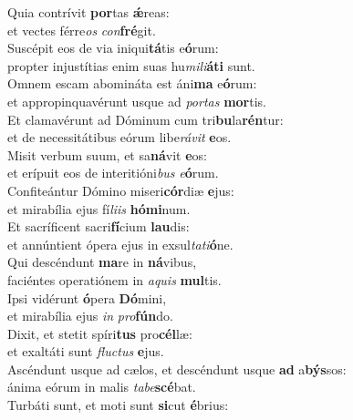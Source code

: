 \evenverse Quia contrívit \textbf{por}tas \textbf{ǽ}reas:~\*\\
\evenverse et vectes férre\textit{os} \textit{con}\textbf{fré}git.\\
\oddverse Suscépit eos de via iniqui\textbf{tá}tis e\textbf{ó}rum:~\*\\
\oddverse propter injustítias enim suas hu\textit{mi}\textit{li}\textbf{á}\textbf{ti} sunt.\\
\evenverse Omnem escam abomináta est áni\textbf{ma} e\textbf{ó}rum:~\*\\
\evenverse et appropinquavérunt usque ad \textit{por}\textit{tas} \textbf{mor}tis.\\
\oddverse Et clamavérunt ad Dóminum cum tri\textbf{bu}la\textbf{rén}tur:~\*\\
\oddverse et de necessitátibus eórum libe\textit{rá}\textit{vit} \textbf{e}os.\\
\evenverse Misit verbum suum, et sa\textbf{ná}vit \textbf{e}os:~\*\\
\evenverse et erípuit eos de interitióni\textit{bus} \textit{e}\textbf{ó}rum.\\
\oddverse Confiteántur Dómino miseri\textbf{cór}diæ \textbf{e}jus:~\*\\
\oddverse et mirabília ejus fí\textit{li}\textit{is} \textbf{hó}\textbf{mi}num.\\
\evenverse Et sacríficent sacri\textbf{fí}cium \textbf{lau}dis:~\*\\
\evenverse et annúntient ópera ejus in exsul\textit{ta}\textit{ti}\textbf{ó}ne.\\
\oddverse Qui descéndunt \textbf{ma}re in \textbf{ná}vibus,~\*\\
\oddverse faciéntes operatiónem in \textit{a}\textit{quis} \textbf{mul}tis.\\
\evenverse Ipsi vidérunt \textbf{ó}pera \textbf{Dó}mini,~\*\\
\evenverse et mirabília ejus \textit{in} \textit{pro}\textbf{fún}do.\\
\oddverse Dixit, et stetit spíri\textbf{tus} pro\textbf{cél}læ:~\*\\
\oddverse et exaltáti sunt \textit{flu}\textit{ctus} \textbf{e}jus.\\
\evenverse Ascéndunt usque ad cælos, et descéndunt usque \textbf{ad} a\textbf{býs}sos:~\*\\
\evenverse ánima eórum in malis \textit{ta}\textit{be}\textbf{scé}bat.\\
\oddverse Turbáti sunt, et moti sunt \textbf{si}cut \textbf{é}brius:~\*\\
